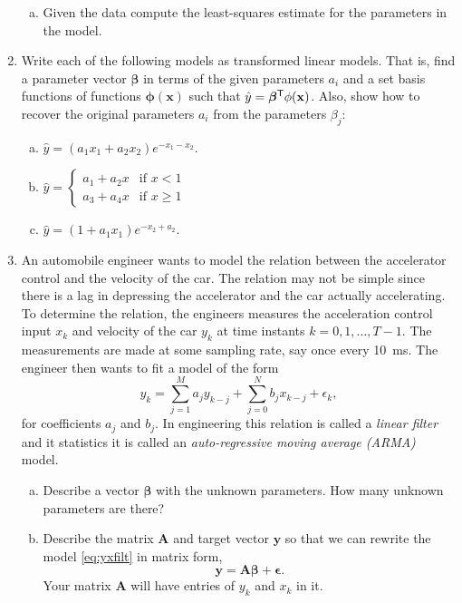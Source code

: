 \documentclass[11pt]{article}
\def\beq{\begin{equation}}
\def\eeq{\end{equation}}
\newcommand{\xbf}{\mathbf{x}}
\newcommand{\ybf}{\mathbf{y}}
\newcommand{\Abf}{\mathbf{A}}
\def\betabf{{\boldsymbol \beta}}
\def\epsilonbf{{\boldsymbol \epsilon}}
\def\phibf{{\boldsymbol \phi}}
\newcommand{\tran}{^{\text{\sf T}}}
\begin{document}
\begin{enumerate}
\begin{center}
\begin{enumerate}[(a)]
\item Given the data compute the least-squares estimate for the parameters
in the model.
\end{enumerate}
\end{center}


\item Write each of the following models as transformed linear models.
That is, find a parameter vector $\betabf$ in terms of the given parameters $a_i$
and a set basis functions of functions $\phibf(\xbf)$ such that $\hat{y}=\betabf\tran\phi(\xbf)$.
Also, show how to recover the original parameters $a_i$ from the parameters $\beta_j$:
\begin{enumerate}[(a)]
\item $\hat{y} = (a_1x_1+a_2x_2)e^{-x_1-x_2}$.
\item $\hat{y} = \begin{cases}
    a_1 + a_2x & \mbox{if } x < 1 \\
    a_3 + a_4x & \mbox{if } x \geq 1
    \end{cases}$
\item $\hat{y} = (1+a_1x_1)e^{-x_2+a_2}$.
\end{enumerate}

\item An automobile engineer wants to model the relation
between the accelerator control and the velocity of the car.
The relation may not be simple since there is a lag in depressing
the accelerator and the car actually accelerating.  To determine
the relation, the engineers measures the acceleration control input $x_k$
and velocity of the car $y_k$ at time instants $k=0,1,\ldots,T-1$.
The measurements are made at some sampling rate, say once every 10~ms.
The engineer then wants to fit a model of the form
\beq \label{eq:yxfilt}
    y_k = \sum_{j=1}^M a_j y_{k-j} + \sum_{j=0}^N b_j x_{k-j} + \epsilon_k,
\eeq
for coefficients $a_j$ and $b_j$.
In engineering this relation is called a \emph{linear filter} and
it statistics it is called an \emph{auto-regressive moving average (ARMA)}
model.
\begin{enumerate}[(a)]
\item Describe a vector $\betabf$ with the unknown parameters.
How many unknown parameters are there?

\item Describe the matrix $\Abf$ and target vector $\ybf$ so that we can
rewrite the model \eqref{eq:yxfilt} in matrix form,
\[
    \ybf = \Abf \betabf + \epsilonbf.
\]
Your matrix $\Abf$ will have entries of $y_k$ and $x_k$ in it.


\end{enumerate}
\end{enumerate}
\end{document}
